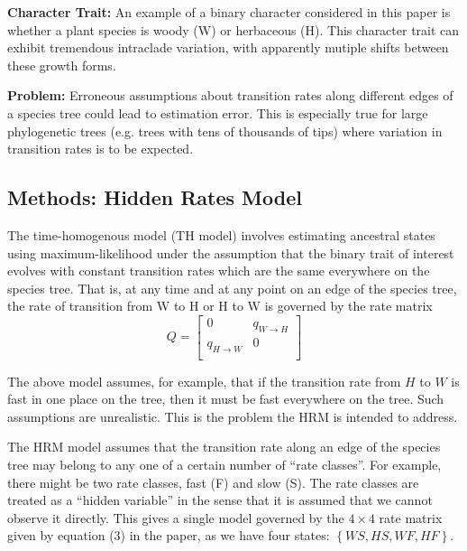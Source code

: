 \documentclass{article}
\begin{document}
\textbf{Character Trait:} An example of a binary character considered in this
paper is whether a plant species is woody (W) or herbaceous (H). This character
trait can exhibit tremendous intraclade variation, with apparently mutiple
shifts between these growth forms.

\textbf{Problem:} Erroneous assumptions about transition rates along different
edges of a species tree could lead to estimation error. This is especially true
for large phylogenetic trees (e.g. trees with tens of thousands of tips) where
variation in transition rates is to be expected.

\subsection{Methods: Hidden Rates Model}

\begin{definition}
  The time-homogenous model (TH model) involves estimating ancestral states
  using maximum-likelihood under the assumption that the binary trait of
  interest evolves with constant transition rates which are the same everywhere
  on the species tree. That is, at any time and at any point on an edge of the
  species tree, the rate of transition from W to H or H to W is governed by the
  rate matrix
  \begin{equation*}
    Q =
    \begin{bmatrix}
      0&q_{W\to H}\\
      q_{H\to W}&0\\
    \end{bmatrix}
  \end{equation*}
\end{definition}
\begin{remark}
  The above model assumes, for example, that if the transition rate from $H$ to
  $W$ is fast in one place on the tree, then it must be fast everywhere on the
  tree. Such assumptions are unrealistic. This is the problem the HRM is
  intended to address.
\end{remark}

The HRM model assumes that the transition rate along an edge of the species tree
may belong to any one of a certain number of ``rate classes''. For example,
there might be two rate classes, fast (F) and slow (S). The rate classes are
treated as a ``hidden variable'' in the sense that it is assumed that we cannot
observe it directly. This gives a single model governed by the $4\times4$ rate
matrix given by equation (3) in the paper, as we have four states:
$\left\{ WS, HS, WF, HF \right\}$.
\end{document}

